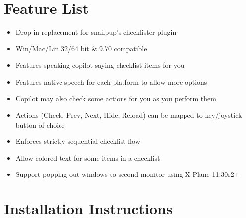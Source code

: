 \documentclass[11pt,parskip=half,a4paper]{scrartcl}
\begin{document}
\section{Feature List}
 
\begin{itemize}
\item Drop-in replacement for snailpup's checklister plugin
\end{itemize}

\begin{itemize}
\item Win/Mac/Lin 32/64 bit \& 9.70 compatible
\end{itemize}

\begin{itemize}
\item Features speaking {\textquotedbl}copilot{\textquotedbl} saying checklist items for you
\end{itemize}

\begin{itemize}
\item Features native speech for each platform to allow more options \ \ \ 
\end{itemize}

\begin{itemize}
\item Copilot may also check some actions for you as you perform them
\end{itemize}

\begin{itemize}
\item Actions (Check, Prev, Next, Hide, Reload) can be mapped to key/joystick button of choice
\end{itemize}

\begin{itemize}
\item Enforces strictly sequential checklist flow
\end{itemize}

\begin{itemize}
\item Allow colored text for some items in a checklist
\end{itemize}

\begin{itemize}
\item Support popping out windows to second monitor using X-Plane 11.30r2+
\end{itemize}

\newpage
\section{Installation Instructions}
\end{document}

